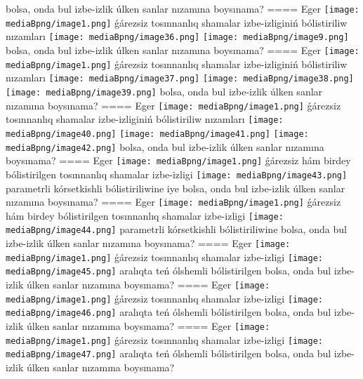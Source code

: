 bolsa, onda bul izbe-izlik úlken sanlar nızamına boysınama?
====
Eger \texttt{[image: mediaBpng/image1.png]} ǵárezsiz tosınnanlıq shamalar izbe-izliginiń bólistiriliw nızamları
\texttt{[image: mediaBpng/image36.png]} \texttt{[image: mediaBpng/image9.png]}
bolsa, onda bul izbe-izlik úlken sanlar nızamına boysınama?
====
Eger \texttt{[image: mediaBpng/image1.png]} ǵárezsiz tosınnanlıq shamalar izbe-izliginiń bólistiriliw nızamları
\texttt{[image: mediaBpng/image37.png]} \texttt{[image: mediaBpng/image38.png]} \texttt{[image: mediaBpng/image39.png]}
bolsa, onda bul izbe-izlik úlken sanlar nızamına boysınama?
====
Eger \texttt{[image: mediaBpng/image1.png]} ǵárezsiz tosınnanlıq shamalar izbe-izliginiń bólistiriliw nızamları
\texttt{[image: mediaBpng/image40.png]} \texttt{[image: mediaBpng/image41.png]} \texttt{[image: mediaBpng/image42.png]}
bolsa, onda bul izbe-izlik úlken sanlar nızamına boysınama?
====
Eger \texttt{[image: mediaBpng/image1.png]} ǵárezsiz hám birdey bólistirilgen tosınnanlıq shamalar izbe-izligi \texttt{[image: mediaBpng/image43.png]} parametrli kórsetkishli bólistiriliwine iye bolsa, onda bul izbe-izlik úlken sanlar nızamına boysınama?
====
Eger \texttt{[image: mediaBpng/image1.png]} ǵárezsiz hám birdey bólistirilgen tosınnanlıq shamalar izbe-izligi \texttt{[image: mediaBpng/image44.png]} parametrli kórsetkishli bólistiriliwine bolsa, onda bul izbe-izlik úlken sanlar nızamına boysınama?
====
Eger \texttt{[image: mediaBpng/image1.png]} ǵárezsiz tosınnanlıq shamalar izbe-izligi \texttt{[image: mediaBpng/image45.png]} aralıqta teń ólshemli bólistirilgen bolsa, onda bul izbe-izlik úlken sanlar nızamına boysınama?
====
Eger \texttt{[image: mediaBpng/image1.png]} ǵárezsiz tosınnanlıq shamalar izbe-izligi \texttt{[image: mediaBpng/image46.png]} aralıqta teń ólshemli bólistirilgen bolsa, onda bul izbe-izlik úlken sanlar nızamına boysınama?
====
Eger \texttt{[image: mediaBpng/image1.png]} ǵárezsiz tosınnanlıq shamalar izbe-izligi \texttt{[image: mediaBpng/image47.png]} aralıqta teń ólshemli bólistirilgen bolsa, onda bul izbe-izlik úlken sanlar nızamına boysınama?
